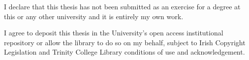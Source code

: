\begin{originality}
I declare that this thesis has not been submitted as an exercise for a degree at this or any other university and it is entirely my own work. 

I agree to deposit this thesis in the University’s open access institutional repository or allow the library to do so on my behalf, subject to Irish Copyright Legislation and Trinity College Library conditions of use and acknowledgement. 
\end{originality}


